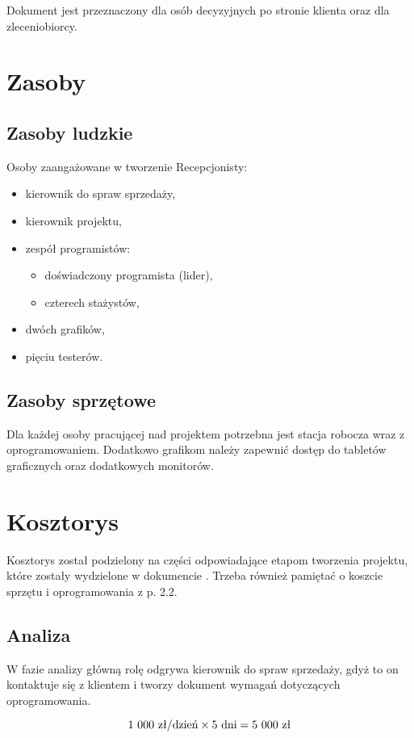 \documentclass [11pt, a4paper, leqno] {article}
\begin{document}
Dokument jest przeznaczony dla osób decyzyjnych po stronie klienta oraz dla zleceniobiorcy.

\section{Zasoby}

\subsection{Zasoby ludzkie}
\noindent
Osoby zaangażowane w tworzenie Recepcjonisty:
\begin{itemize}
\item kierownik do spraw sprzedaży,
\item kierownik projektu,
\item zespół programistów:
  \begin{itemize}
  \item doświadczony programista (lider),
  \item czterech stażystów,
  \end{itemize}
\item dwóch grafików,
\item pięciu testerów.
\end{itemize}

\subsection{Zasoby sprzętowe}
\noindent
Dla każdej osoby pracującej nad projektem potrzebna jest stacja robocza wraz z oprogramowaniem. Dodatkowo grafikom należy zapewnić dostęp do tabletów graficznych oraz dodatkowych monitorów.

\section{Kosztorys}
\noindent
Kosztorys został podzielony na części odpowiadające etapom tworzenia projektu, które zostały wydzielone w dokumencie \cite{zalozenia}. Trzeba również pamiętać o koszcie sprzętu i oprogramowania z p. 2.2.

\subsection{Analiza}
\noindent
W fazie analizy główną rolę odgrywa kierownik do spraw sprzedaży, gdyż to on kontaktuje się z klientem i tworzy dokument wymagań dotyczących oprogramowania.

\begin{equation}1\\\ 000 \text{ zł/dzień} \times 5 \text{ dni} = 5\\\ 000 \text{ zł} \end{equation}
\end{document}
